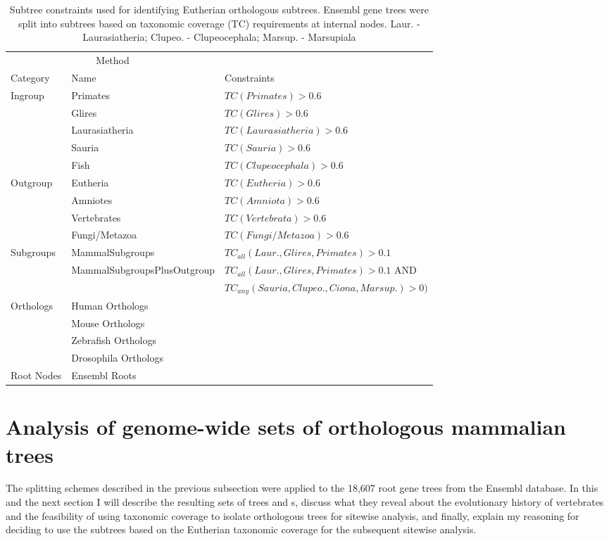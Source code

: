 \begin{table} \footnotesize
\centering
\begin{tabular}{@{}lll@{}} \toprule
\multicolumn{2}{c}{Method} \\ \cmidrule(r){1-2}
   Category & Name & Constraints \\ \midrule
Ingroup & Primates & $TC(Primates) > 0.6$ \\
 &   Glires &  $TC(Glires) > 0.6$ \\
 &   Laurasiatheria & $TC(Laurasiatheria) > 0.6$ \\
 &   Sauria & $TC(Sauria) > 0.6$ \\
 &   Fish & $TC(Clupeocephala) > 0.6$ \\
Outgroup &  Eutheria & $TC(Eutheria) > 0.6$ \\
 &   Amniotes & $TC(Amniota) > 0.6$\\
 &   Vertebrates & $TC(Vertebrata) > 0.6$\\
 &   Fungi/Metazoa & $TC(Fungi/Metazoa) > 0.6$\\
Subgroups &  MammalSubgroups & $TC_{all}(Laur., Glires, Primates) > 0.1$\\
 &   \scriptsize{MammalSubgroupsPlusOutgroup} & $TC_{all}(Laur., Glires, Primates) > 0.1$ AND \\
 &    & $TC_{any}(Sauria, Clupeo., Ciona, Marsup.) > 0)$ \\
Orthologs & Human Orthologs & \\
 &   Mouse Orthologs &  \\
 &   Zebrafish Orthologs &  \\
 &   Drosophila Orthologs &  \\
Root Nodes & Ensembl Roots &  \\
\bottomrule
\end{tabular}
\caption{Subtree constraints used for identifying Eutherian
  orthologous subtrees. Ensembl gene trees were split into subtrees
  based on taxonomic coverage (TC) requirements at internal
  nodes. Laur. - Laurasiatheria; Clupeo. - Clupeocephala; Marsup. -
  Marsupiala}
\label{subtree_constraints}
\end{table}

\section{Analysis of genome-wide sets of orthologous mammalian trees}

The \subtr splitting schemes described in the previous subsection were
applied to the 18,607 root gene trees from the Ensembl database. In
this and the next section I will describe the resulting sets of trees
and \subtr{}s, discuss what they reveal about the evolutionary history
of vertebrates and the feasibility of using taxonomic coverage to
isolate orthologous trees for sitewise analysis, and finally, explain
my reasoning for deciding to use the subtrees based on the Eutherian
taxonomic coverage for the subsequent sitewise analysis.

